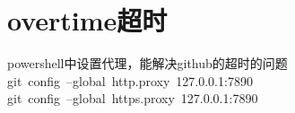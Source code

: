 \documentclass[12pt,twiside,a4paper]{ctexbook}
\numberwithin{chapter}{part}
\begin{document}

\chapter{overtime超时}
powershell中设置代理，能解决github的超时的问题\\
git config --global http.proxy 127.0.0.1:7890\\
git config --global https.proxy 127.0.0.1:7890 \\


\clearpage
\end{document}
